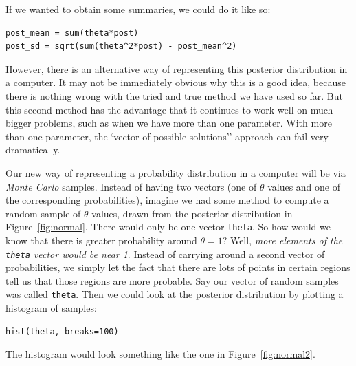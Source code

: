 If we wanted to obtain some summaries, we could do it like so:
\begin{verbatim}
post_mean = sum(theta*post)
post_sd = sqrt(sum(theta^2*post) - post_mean^2)
\end{verbatim}

However,
there is an alternative way of representing this posterior distribution in a
computer. It may not be immediately obvious why this is a good idea,
because there is nothing wrong with the tried and true method we have used
so far. But this second method has the advantage that it continues to
work well on much bigger problems, such as when we have more than one parameter.
With more than one parameter, the `vector of possible solutions'' approach
can fail very dramatically.

Our new way of representing a probability distribution in a computer will be
via {\it Monte Carlo} samples.
Instead of having two vectors (one of $\theta$ values and one of the
corresponding probabilities),
imagine we had some method to compute a random sample of $\theta$ values, drawn
from the posterior distribution in Figure~\ref{fig:normal}.
There would only be one vector {\tt theta}. So how would we
know that there is greater probability around $\theta=1$? Well, {\it more elements
of the {\tt theta} vector would be near 1}.
Instead of carrying around a second vector of
probabilities, we simply let the fact that there are lots of points in certain
regions tell us that those regions are more probable. Say our vector of random
samples was called {\tt theta}. Then we could look at the posterior distribution
by plotting a histogram of samples:
\begin{verbatim}
hist(theta, breaks=100)
\end{verbatim}
The histogram would look something like the one in Figure~\ref{fig:normal2}.
